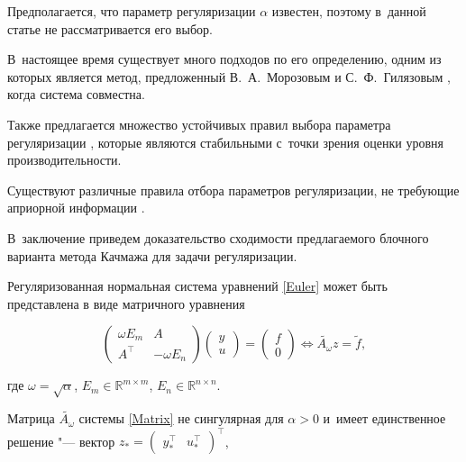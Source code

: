 Предполагается, что параметр регуляризации $\alpha$ известен, поэтому в~данной статье не рассматривается его выбор. 

В~настоящее время существует много подходов по его определению, одним из которых является метод, предложенный В.~А.~Морозовым и С.~Ф.~Гилязовым \cite{Morozov}, когда система совместна. 

Также предлагается множество устойчивых правил выбора параметра регуляризации \cite{Hamarik, Dolishniy}, которые являются стабильными с~точки зрения оценки уровня производительности. 

Существуют различные правила отбора параметров регуляризации, не требующие априорной информации \cite{Zhdanov2}.



В~заключение  приведем доказательство сходимости предлагаемого блочного варианта метода Качмажа для задачи регуляризации.



\smallskip






Регуляризованная нормальная система уравнений \eqref{Euler} может быть представлена в виде матричного уравнения

\begin{equation}

\begin{pmatrix} \omega E_{m} & A \\ A^{\top} & -\omega E_{n} \end{pmatrix}

\begin{pmatrix} y \\ u \end{pmatrix} =

\begin{pmatrix} f \\ 0 \end{pmatrix}

\Longleftrightarrow \widetilde{A_{\omega}}z=\widetilde{f},

\label{Matrix}

\end{equation}

где $\omega=\sqrt{\alpha}$, $E_{m}\in \mathbb R^{m\times m}$, $E_{n}\in \mathbb R^{n\times n}$.



Матрица $\widetilde{A_{\omega}}$ системы \eqref{Matrix} не сингулярная для $\alpha >0$ и~имеет единственное решение "--- вектор $z_{\ast}=\begin{pmatrix} y^{\top}_{\ast} & u^{\top}_{\ast} \end{pmatrix}^{\top}$, 

